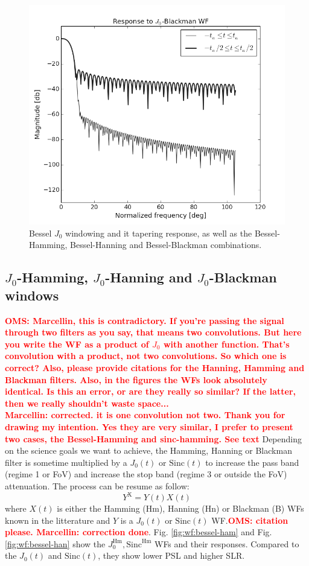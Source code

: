 \documentclass[useAMS,usenatbib]{mn2e}
\newcommand{\OMS}[1]{\textcolor{red}{{\bf OMS: #1}}}
\begin{document}
\begin{figure}
\includegraphics[width=.25\textwidth]{./Figures/freq_resp_bessel-blackmangrey.png}
\caption{Bessel $J_0$ windowing and it tapering response, as well as the Bessel-Hamming, Bessel-Hanning
and Bessel-Blackman combinations.}\label{fig:wf:bessels}
\end{figure}

\subsection{$J_0$-Hamming, $J_0$-Hanning and $J_0$-Blackman windows}

\OMS{Marcellin, this is contradictory. If you're passing the signal through two filters as you say, that means 
two convolutions. But here you write the WF as a product of $J_0$ with another function. That's convolution with a 
product, not two convolutions. So which one is correct? Also, please provide citations for the Hanning, Hamming and 
Blackman filters. Also, in the figures the WFs look absolutely identical. Is this an error, or are they really so similar?
If the latter, then we really shouldn't waste space... \\Marcellin: corrected. it is one convolution not two.
Thank you for drawing my intention. Yes they are very similar, I prefer to present two cases, the Bessel-Hamming and sinc-hamming. See text}
Depending on the science goals we want to achieve, the Hamming, Hanning or Blackman filter is sometime multiplied by 
a $J_0(t)$ or $\mathrm{Sinc}(t)$ to increase the pass band (regime 1 or FoV) and 
increase the stop band (regime 3 or outside the FoV) attenuation.
The process can be resume as follow:
\begin{equation}
Y^\mathrm{X} = Y(t) X(t) 
\end{equation}
where $X(t)$ is either the Hamming (Hm), Hanning (Hn) or Blackman (B) WFs known in the litterature
\citep{nuttall1982spectral,podder2014comparative} and $Y$ is a $J_0(t)$ or $\mathrm{Sinc}(t)$ WF.\OMS{citation please. Marcellin: correction done}.
Fig. \ref{fig:wf:bessel-ham} and Fig. \ref{fig:wf:bessel-han}  
show the $J_0^\mathrm{Hm}, \mathrm{Sinc}^\mathrm{Hm}$ WFs and their responses. Compared to the $J_0(t)$ and 
$\mathrm{Sinc}(t)$, they show lower PSL and higher SLR.
\end{document}
